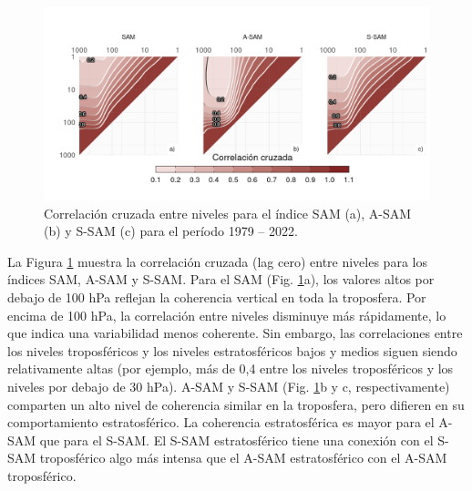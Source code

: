 \documentclass[12pt,oneside]{reedthesis}
\begin{document}
\begin{figure}
\includegraphics{figures/30-sam/cross-correlation-1} \caption{Correlación cruzada entre niveles para el índice SAM (a), A-SAM (b) y S-SAM (c) para el período 1979 -- 2022.}\label{fig:cross-correlation}
\end{figure}

La Figura \ref{fig:cross-correlation} muestra la correlación cruzada (lag cero) entre niveles para los índices SAM, A-SAM y S-SAM.
Para el SAM (Fig. \ref{fig:cross-correlation}a), los valores altos por debajo de 100 hPa reflejan la coherencia vertical en toda la troposfera.
Por encima de 100 hPa, la correlación entre niveles disminuye más rápidamente, lo que indica una variabilidad menos coherente.
Sin embargo, las correlaciones entre los niveles troposféricos y los niveles estratosféricos bajos y medios siguen siendo relativamente altas (por ejemplo, más de 0,4 entre los niveles troposféricos y los niveles por debajo de 30 hPa).
A-SAM y S-SAM (Fig. \ref{fig:cross-correlation}b y c, respectivamente) comparten un alto nivel de coherencia similar en la troposfera, pero difieren en su comportamiento estratosférico.
La coherencia estratosférica es mayor para el A-SAM que para el S-SAM.
El S-SAM estratosférico tiene una conexión con el S-SAM troposférico algo más intensa que el A-SAM estratosférico con el A-SAM troposférico.
\end{document}
